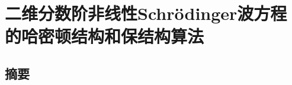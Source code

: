 \chapter[二维分数阶非线性Schr{\"o}dinger波方程的哈密顿结构和保结构算法]{二维分数阶非线性Schr{\"o}dinger波方程的哈密顿结构和保结构算法}

\section*{摘要}




